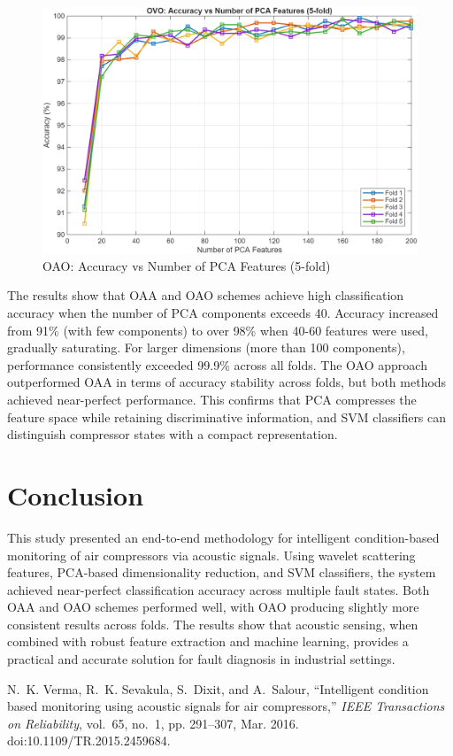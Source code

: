 \documentclass[12pt,a4paper]{article}
\begin{document}
\begin{multicols}{2}
\begin{figure}[H]
    \centering
    \includegraphics[width=1\linewidth]{Diagrams/res2.png}
    \caption{OAO: Accuracy vs Number of PCA Features (5-fold)}
    \label{fig:OAO_results}
\end{figure}

The results show that OAA and OAO schemes achieve high classification accuracy when the number of PCA components exceeds 40.  Accuracy increased from 91\% (with few components) to over 98\% when 40-60 features were used, gradually saturating.  For larger dimensions (more than 100 components), performance consistently exceeded 99.9\% across all folds.  
 The OAO approach outperformed OAA in terms of accuracy stability across folds, but both methods achieved near-perfect performance. 
 This confirms that PCA compresses the feature space while retaining discriminative information, and SVM classifiers can distinguish compressor states with a compact representation.

\section{Conclusion}
\label{sec:conclusion}
This study presented an end-to-end methodology for intelligent condition-based monitoring of air compressors via acoustic signals.  Using wavelet scattering features, PCA-based dimensionality reduction, and SVM classifiers, the system achieved near-perfect classification accuracy across multiple fault states.  Both OAA and OAO schemes performed well, with OAO producing slightly more consistent results across folds.  The results show that acoustic sensing, when combined with robust feature extraction and machine learning, provides a practical and accurate solution for fault diagnosis in industrial settings.

\begin{thebibliography}{1}
N.~K. Verma, R.~K. Sevakula, S.~Dixit, and A.~Salour, ``Intelligent condition based monitoring using acoustic signals for air compressors,'' \emph{IEEE Transactions on Reliability}, vol.~65, no.~1, pp. 291--307, Mar. 2016. doi:10.1109/TR.2015.2459684.
\end{thebibliography}
\end{multicols}
\end{document}
